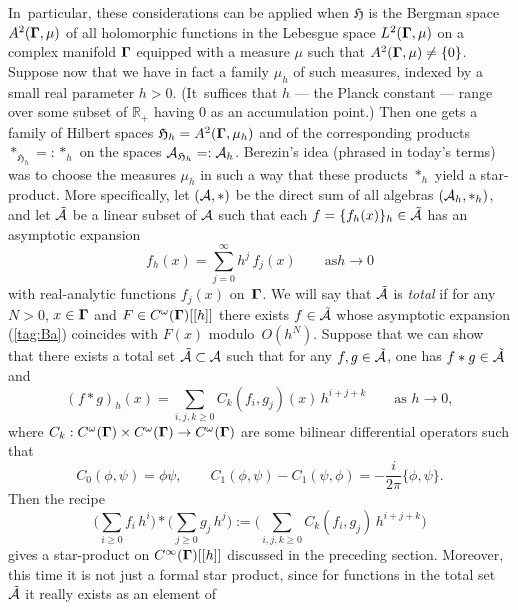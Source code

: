 \documentclass[11pt]{amsart}
\numberwithin{equation}{section}
\theoremstyle{remark}
\newcommand\AAA{{\Cal A}}
\newcommand\Omg{{\bigam}}   %
\newcommand\HH{\mathfrak H}
\newcommand\RR{\mathbb R}
\newcommand{\bigam}{\mbox{\boldmath $\Gamma$}}
\begin{document}
In~particular, these considerations can be applied when $\HH$ is the Bergman
space $A^2(\Omg,\mu)$ of all holomorphic functions in the Lebesgue space
$L^2(\Omg,\mu)$ on a complex manifold $\Omg$ equipped with a measure $\mu$
such that $A^2(\Omg,\mu)\neq\{0\}$. Suppose now that we have in fact a family
$\mu_h$ of such measures, indexed by a small real parameter $h>0$. (It~suffices
that $h$ --- the Planck constant --- range over some subset of $\RR_+$ having 0
as an accumulation point.) Then one gets a family of Hilbert spaces
$\HH_h=A^2(\Omg,\mu_h)$ and of the corresponding products $*_{\HH_h}=:*_h$ on
the spaces $\AAA_{\HH_h}=:\AAA_h$. Berezin's idea (phrased in today's terms)
was to choose the measures $\mu_h$ in such a way that these products $*_h$
yield a star-product. More specifically, let $(\AAA,*)$ be the direct sum of
all algebras $(\AAA_h,*_h)$, and let $\tilde\AAA$ be a linear subset of $\AAA$
such that each $f=\{f_h(x)\}_h\in\tilde\AAA$ has an asymptotic expansion
\begin{equation}  f_h(x) = \sum_{j=0}^\infty h^j \, f_j(x) \qquad\text{as
}h\to0  \label{tag:Ba}  \end{equation}
with real-analytic functions $f_j(x)$ on~$\Omg$. We will say that $\tilde
\AAA$ is {\sl total\/} if for any $N>0$, $x\in\Omg$ and $F\in C^\omega(\Omg)
[[h]]$ there exists $f\in\tilde\AAA$ whose asymptotic expansion (\ref{tag:Ba})
coincides with $F(x)$ modulo~$O(h^N)$. Suppose that we can show that there
exists a total set $\tilde\AAA\subset\AAA$ such that for any
$f,g\in\tilde\AAA$, one has $f*g\in\tilde\AAA$ and
\begin{equation}  (f*g)_h(x) = \sum_{i,j,k\ge0} C_k(f_i,g_j)(x) \,h^{i+j+k}
\qquad \text{as } h\to0 ,  \label{tag:Bba}  \end{equation}
where $C_k:C^\omega(\Omg)\times C^\omega(\Omg)\to C^\omega(\Omg)$ are
some bilinear differential operators such that
\begin{equation}  C_0(\phi,\psi)=\phi\psi, \qquad C_1(\phi,\psi)-C_1(\psi,\phi)
= -\frac i{2\pi}\{\phi,\psi\}.  \label{tag:Bbd}  \end{equation}
Then the recipe
\begin{equation}  \Big( \sum_{i\ge0} f_i \, h^i\Big) * \Big(\sum_{j\ge0} g_j \,
h^j\Big) := \Big( \sum_{i,j,k\ge0} C_k(f_i,g_j) \, h^{i+j+k} \Big)
\label{tag:Bs}  \end{equation}
gives a star-product on $C^\infty(\Omg)[[h]]$ discussed in the preceding
section.  Moreover, this time it is not just a formal star product, since for
functions in the total set $\tilde\AAA$ it really exists as an element of
\end{document}
